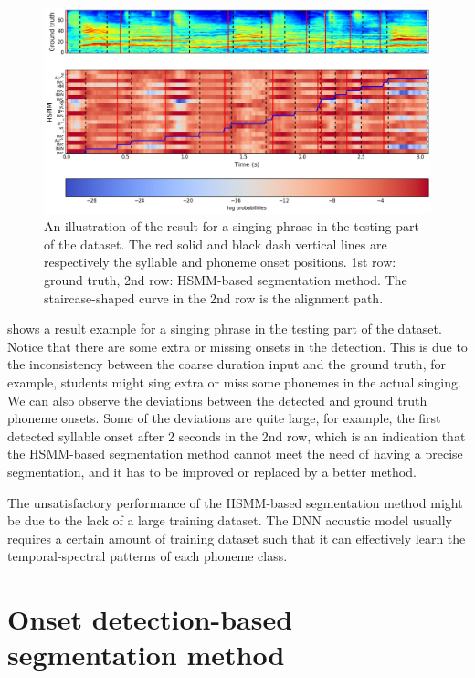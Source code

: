 \begin{landscape}
\mbox{}\vfill
\begin{figure}[ht!]
    \centering
    \includegraphics[width=1.4\textwidth]{figs/results/ch5_results_hsmm_baseline.png}
    \caption{An illustration of the result for a singing phrase in the testing part of the dataset. The red solid and black dash vertical lines are respectively the syllable and phoneme onset positions. 1st row: ground truth, 2nd row: HSMM-based segmentation method. The staircase-shaped curve in the 2nd row is the alignment path.}
    \label{fig:ch5:results_example_hsmm}
\end{figure}
\vfill
\end{landscape}

 shows a result example for a singing phrase in the testing part of the dataset. Notice that there are some extra or missing onsets in the detection. This is due to the inconsistency between the coarse duration input and the ground truth, for example, students might sing extra or miss some phonemes in the actual singing. We can also observe the deviations between the detected and ground truth phoneme onsets. Some of the deviations are quite large, for example, the first detected syllable onset after 2 seconds in the 2nd row, which is an indication that the \gls{HSMM}-based segmentation method cannot meet the need of having a precise segmentation, and it has to be improved or replaced by a better method. 

The unsatisfactory performance of the \gls{HSMM}-based segmentation method might be due to the lack of a large training dataset. The \gls{DNN} acoustic model usually requires a certain amount of training dataset such that it can effectively learn the temporal-spectral patterns of each phoneme class.

\section{Onset detection-based segmentation method}\label{sec:ch5:onset_segmentation}

